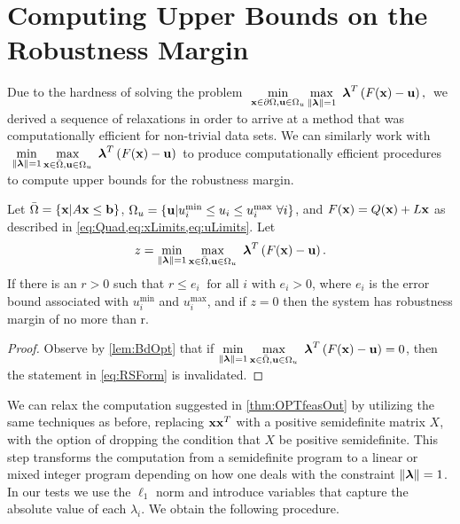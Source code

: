 \section{Computing Upper Bounds on the Robustness Margin} \label{sec:outbdform}  

Due to the hardness of solving the problem $~\displaystyle \min\limits_{\vx\in \partial \Omega, \vu\in\Omega_u}\max\limits_{\norm{\vlambda}=1 }\ \vlambda^T\left(F(\vx)-\vu\right),\,$ we derived a sequence of relaxations in order to arrive at a method that was computationally efficient for non-trivial data sets. 
We can similarly work with $~\displaystyle \min\limits_{\lVert\boldsymbol{\lambda}\rVert=1}\max\limits_{\mathbf{x}\in \bar{\Omega}, \mathbf{u}\in\Omega_u}\ \boldsymbol{\lambda}^T\left(F(\mathbf{x})-\mathbf{u}\right) \,$ to produce computationally efficient procedures to compute upper bounds for the robustness margin. 

\bigskip
\begin{thm}\label{thm:OPTfeasOut} 
Let $\bar{\Omega}=\{\mathbf{x}| A\mathbf{x}\leq \mathbf{b}\}$, $\Omega_{u}=\{\mathbf{u}| u^{\min}_i\leq u_i \leq u^{\max}_i \ \forall i \}$, and $F(\mathbf{x})=Q(\mathbf{x})+L\mathbf{x}$ as described in \cref{eq:Quad,eq:xLimits,eq:uLimits}. 
Let
\[
  z = \min\limits_{\lVert\boldsymbol{\lambda}\rVert=1}\max\limits_{\mathbf{x}\in \bar{\Omega}, \mathbf{u}\in\Omega_u}\ \boldsymbol{\lambda}^T\left(F(\mathbf{x})-\mathbf{u}\right).
\]
If there is an $r>0$ such that $r \leq e_i \ \mbox{ for all } i \mbox{ with } e_i>0$, where $e_i$ is the error bound associated with $ u^{\min}_i$ and $ u^{\max}_i$, and if $z=0$ then the system has robustness margin of no more than r.

\medskip
\begin{proof} 
  Observe by \cref{lem:BdOpt} that if $\min\limits_{\norm{\vlambda}=1}\max\limits_{\vx\in \bar{\Omega}, \vu \in \Omega_u}\ \vlambda^T\left(F(\vx)-\vu\right)=0$, then the statement in \cref{eq:RSForm} is invalidated.  
%
\end{proof}
\end{thm}

\bigskip
We can relax the computation suggested in \cref{thm:OPTfeasOut} by utilizing the same techniques as before, replacing $\mathbf{x}\mathbf{x}^T$ with a positive semidefinite matrix $X$, with the option of dropping the condition that $X$ be positive semidefinite.
This step transforms the computation from a semidefinite program to a linear or mixed integer program depending on how one deals with the constraint $\lVert\boldsymbol{\lambda}\rVert=1$. 
In our tests we use the $\ell_1$ norm and introduce variables that capture the absolute value of each $\lambda_i$.
We obtain the following procedure.

